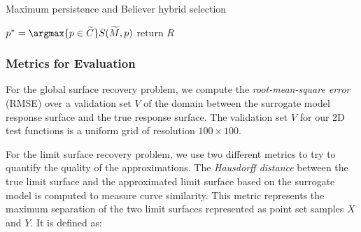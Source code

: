 {\fontsize{10}{10}\selectfont
\begin{algorithm}
\scriptsize
\caption{Maximum persistence and Believer hybrid selection}
\label{algo:maxp-believe}
\begin{algorithmic}
    \State $p^* = \argmax{p \in \widetilde{C}} S(\widetilde{M}, p)$
  \EndWhile
\EndWhile
\State return $R$
\EndProcedure
\end{algorithmic}
\end{algorithm}
}

\subsubsection{Metrics for Evaluation}
%
For the global surface recovery problem, we compute the \emph{root-mean-square error} (RMSE) over a validation set $V$ of the domain between the surrogate model response surface and the true response surface.
%
The validation set $V$ for our $2$D test functions is a uniform grid of resolution $100\times100$.

For the limit surface recovery problem, we use two different metrics to try to quantify the quality of the approximations.
%
The \emph{Hausdorff distance} between the true limit surface and the approximated limit surface based on the surrogate model is computed to measure curve similarity.
%
This metric represents the maximum separation of the two limit surfaces represented as point set samples $X$ and $Y$. It is defined as:

